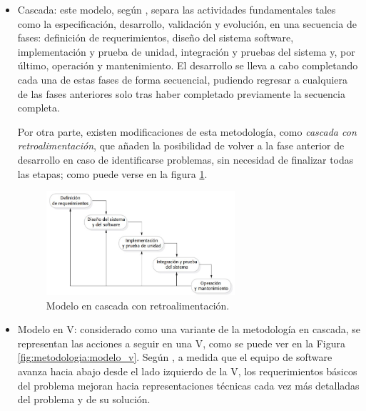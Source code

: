         \begin{itemize}
        \item Cascada: este modelo, según  \cite{sommerville_software_2011}, separa las actividades fundamentales tales como la especificación, desarrollo, validación y evolución, en una secuencia de fases: definición de requerimientos, diseño del sistema software, implementación y prueba de unidad, integración y pruebas del sistema y, por último, operación y mantenimiento. El desarrollo se lleva a cabo completando cada una de estas fases de forma secuencial, pudiendo regresar a cualquiera de las fases anteriores solo tras haber completado previamente la secuencia completa.
    
        Por otra parte, existen modificaciones de esta metodología, como \textit{cascada con retroalimentación}, que añaden la posibilidad de volver a la fase anterior de desarrollo en caso de identificarse problemas, sin necesidad de finalizar todas las etapas; como puede verse en la figura \ref{fig:metodologia:cascada_retroalimentada}.
    
        \begin{figure}[h]
            \centering
            \includegraphics[width=0.66\textwidth]{figures/cascada retroalimentada.JPG}
            \caption[Modelo en cascada con retroalimentación, extraído de \cite{sommerville_software_2011}]{Modelo en cascada con retroalimentación.}
            \label{fig:metodologia:cascada_retroalimentada}
        \end{figure}
        
        \item Modelo en V: considerado como una variante de la metodología en cascada, se representan las acciones a seguir en una V, como se puede ver en la Figura \ref{fig:metodologia:modelo_v}. Según \cite{pressman_software_2005}, a medida que el equipo de software avanza hacia abajo desde el lado izquierdo de la V, los requerimientos básicos del problema mejoran hacia representaciones técnicas cada vez más detalladas del problema y de su solución. 
        

\end{itemize}
